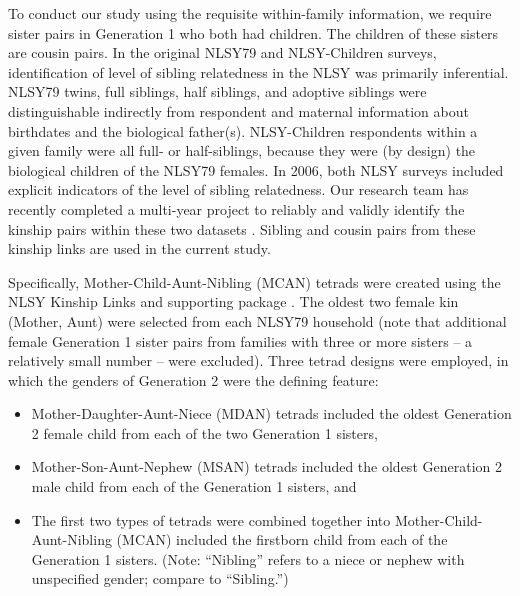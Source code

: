 To conduct our study using the requisite within-family information, we require sister pairs in Generation 1 who both had children. The children of these sisters are cousin pairs. In the original NLSY79 and NLSY-Children surveys, identification of level of sibling relatedness in the NLSY was primarily inferential. NLSY79 twins, full siblings, half siblings, and adoptive siblings were distinguishable indirectly from respondent and maternal information about birthdates and the biological father(s). NLSY-Children respondents within a given family were all full- or half-siblings, because they were (by design) the biological children of the NLSY79 females. In 2006, both NLSY surveys included explicit indicators of the level of sibling relatedness. Our research team has recently completed a multi-year project to reliably and validly identify the kinship pairs within these two datasets \citep{nlsylinksbgpaper}. Sibling and cousin pairs from these kinship links are used in the current study.

Specifically, Mother-Child-Aunt-Nibling (MCAN) tetrads were created using the NLSY Kinship Links \citep{nlsylinksbgpaper} and supporting \R package \citep{nlsylinksr}. The oldest two female kin (Mother, Aunt) were selected from each NLSY79 household (note that additional female Generation 1 sister pairs from families with three or more sisters -- a relatively small number -- were excluded). Three tetrad designs were employed, in which the genders of Generation 2 were the defining feature: 
\begin{itemize}\item Mother-Daughter-Aunt-Niece (MDAN) tetrads included the oldest Generation 2 female child from each of the two Generation 1 sisters, 
\item Mother-Son-Aunt-Nephew (MSAN) tetrads included the oldest Generation 2 male child from each of the Generation 1 sisters, and 
\item The first two types of tetrads were combined together into Mother-Child-Aunt-Nibling (MCAN) included the firstborn child from each of the Generation 1 sisters. (Note: ``Nibling'' refers to a niece or nephew with unspecified gender; compare to ``Sibling.'')\end{itemize} 
